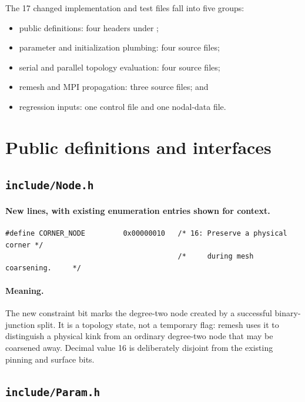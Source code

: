 \documentclass[11pt]{article}
\begin{document}
The 17 changed implementation and test files fall into five groups:

\begin{itemize}
  \item public definitions: four headers under ;
  \item parameter and initialization plumbing: four source files;
  \item serial and parallel topology evaluation: four source files;
  \item remesh and MPI propagation: three source files; and
  \item regression inputs: one control file and one nodal-data file.
\end{itemize}

\section{Public definitions and interfaces}

\subsection{\texttt{include/Node.h}}

\paragraph{New lines, with existing enumeration entries shown for context.}

\begin{lstlisting}[style=cpp]
#define CORNER_NODE         0x00000010   /* 16: Preserve a physical corner */
                                         /*     during mesh coarsening.     */
\end{lstlisting}

\paragraph{Meaning.}
The new constraint bit marks the degree-two node created by a successful
binary-junction split.  It is a topology state, not a temporary flag: remesh
uses it to distinguish a physical kink from an ordinary degree-two node that
may be coarsened away.  Decimal value 16 is deliberately disjoint from the
existing pinning and surface bits.

\subsection{\texttt{include/Param.h}}
\end{document}

